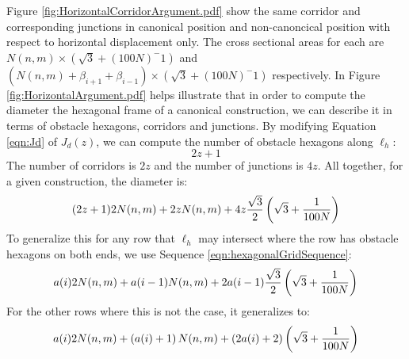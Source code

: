 Figure \ref{fig:HorizontalCorridorArgument.pdf} show the same corridor and corresponding junctions in canonical position and non-canoncical position with respect to horizontal displacement only.  
The cross sectional areas for each are $N(n,m) \times (\sqrt{3} + (100N)^-1)$ and $(N(n,m) + \beta_{i+1} + \beta_{i-1}) \times (\sqrt{3} + (100N)^-1)$ respectively.  
In Figure \ref{fig:HorizontalArgument.pdf} helps illustrate that in order to compute the diameter the hexagonal frame of a canonical construction, we can describe it in terms of obstacle hexagons, corridors and junctions.
By modifying Equation \ref{eqn:Jd} of $J_d(z)$, we can compute the number of obstacle hexagons along $\ell_h$:
$$2z+1$$
The number of corridors is $2z$ and the number of junctions is $4z$.
All together, for a given construction, the diameter is:
\begin{equation}\label{eqn:diameterLh}
(2z+1)2N(n,m) + 2z N(n,m) + 4z \frac{\sqrt{3}}{2} \left( \sqrt{3}+\frac{1}{100N} \right)
\end{equation}
To generalize this for any row that $\ell_h$ may intersect where the row has obstacle hexagons on both ends, we use Sequence \ref{eqn:hexagonalGridSequence}:
$$a(i)2N(n,m) + a(i-1) N(n,m) + 2a(i-1) \frac{\sqrt{3}}{2} \left( \sqrt{3}+\frac{1}{100N} \right)$$
For the other rows where this is not the case, it generalizes to:
$$a(i) 2N(n,m) + \left( a(i) + 1 \right) N(n,m) + \left( 2 a(i) + 2 \right) \left( \sqrt{3}+\frac{1}{100N} \right)$$


